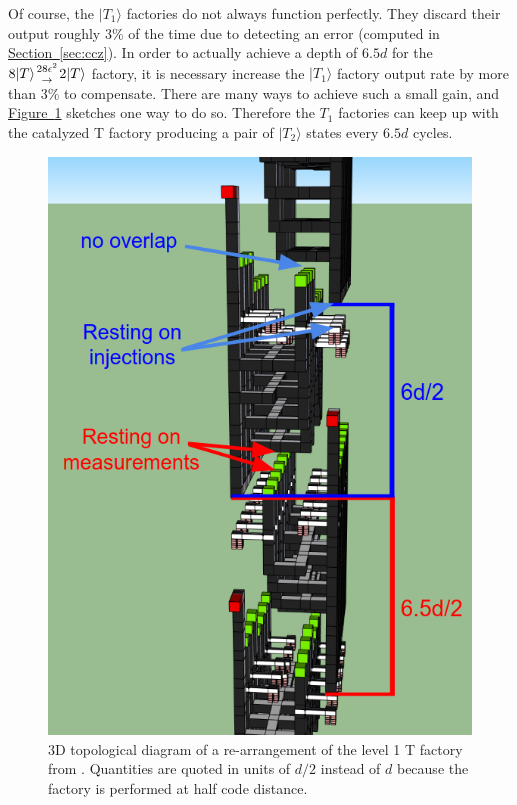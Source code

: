 \documentclass[superscriptaddress,notitlepage,longbibliography]{revtex4-1}
\renewcommand{\sec}[1]{\hyperref[sec:#1]{Section~\ref*{sec:#1}}}
\newcommand{\fig}[1]{\hyperref[fig:#1]{Figure~\ref*{fig:#1}}}
\newcommand{\factory}[3]{$#1 \genfrac{}{}{0pt}{}{#2}{\rightarrow} {#3}$ factory}
\begin{document}
Of course, the $|T_1\rangle$ factories do not always function perfectly.
They discard their output roughly 3\% of the time due to detecting an error (computed in \sec{ccz}).
In order to actually achieve a depth of $6.5d$ for the \factory{8|T\rangle}{28\epsilon^2}{2|T\rangle}, it is necessary increase the $|T_1\rangle$ factory output rate by more than 3\% to compensate.
There are many ways to achieve such a small gain, and \fig{t1-3d} sketches one way to do so.
Therefore the $T_1$ factories can keep up with the catalyzed T factory producing a pair of $|T_2\rangle$ states every $6.5d$ cycles.


\begin{figure}[ht]
    \label{fig:t1-3d}
    \centering
    \includegraphics[width=\textwidth,height=\dimexpr\textheight-12\baselineskip,keepaspectratio]{t1-3d.png}
    \caption{
        3D topological diagram of a re-arrangement of the level 1 T factory from \cite{fowler2018}.
        Quantities are quoted in units of $d/2$ instead of $d$ because the factory is performed at half code distance.
}
\end{figure}
\end{document}
